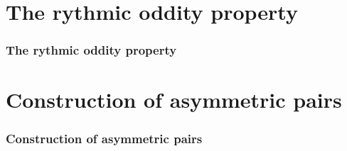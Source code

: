 \documentclass{beamer}
\theoremstyle{definition}
\newtheorem{defi}[teorema]{Definición}
\newcommand{\D}{\mathbb{D}}
\begin{document}

\begin{frame}


\end{frame}

\section{The rythmic oddity property}

\begin{frame}
\frametitle{The rythmic oddity property}

\end{frame}

\begin{frame}


\end{frame}

\section{Construction of asymmetric pairs}



\begin{frame}
\frametitle{Construction of asymmetric pairs}

\end{frame}
\begin{frame}
\end{frame}
\end{document}
